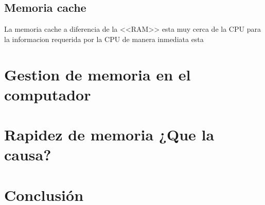 \documentclass{article}
\begin{document}
\subsection{Memoria cache}
La memoria cache a diferencia de la <<RAM>> esta muy cerca de la CPU para la informacion requerida por la CPU de manera inmediata esta 


\section{Gestion de memoria en el computador}

\section{Rapidez de memoria ¿Que la causa?}

\section{Conclusión} \label{conclulsion}



\end{document}

